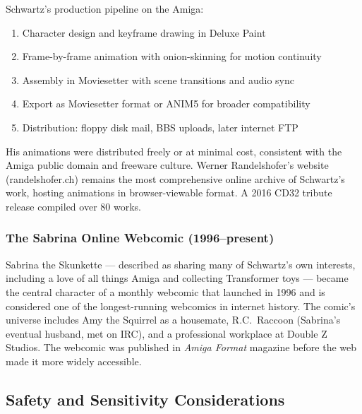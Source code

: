 \documentclass[11pt,letterpaper]{article}
\begin{document}
Schwartz's production pipeline on the Amiga:
\begin{enumerate}[leftmargin=2em]
  \item Character design and keyframe drawing in Deluxe Paint
  \item Frame-by-frame animation with onion-skinning for motion continuity
  \item Assembly in Moviesetter with scene transitions and audio sync
  \item Export as Moviesetter format or ANIM5 for broader compatibility
  \item Distribution: floppy disk mail, BBS uploads, later internet FTP
\end{enumerate}

His animations were distributed freely or at minimal cost, consistent with the Amiga public domain and freeware culture. Werner Randelshofer's website (randelshofer.ch) remains the most comprehensive online archive of Schwartz's work, hosting animations in browser-viewable format. A 2016 CD32 tribute release compiled over 80 works.

\subsubsection{The Sabrina Online Webcomic (1996--present)}

Sabrina the Skunkette --- described as sharing many of Schwartz's own interests, including a love of all things Amiga and collecting Transformer toys --- became the central character of a monthly webcomic that launched in 1996 and is considered one of the longest-running webcomics in internet history. The comic's universe includes Amy the Squirrel as a housemate, R.C.\ Raccoon (Sabrina's eventual husband, met on IRC), and a professional workplace at Double Z Studios. The webcomic was published in \textit{Amiga Format} magazine before the web made it more widely accessible.

\subsection{Safety and Sensitivity Considerations}
\end{document}
